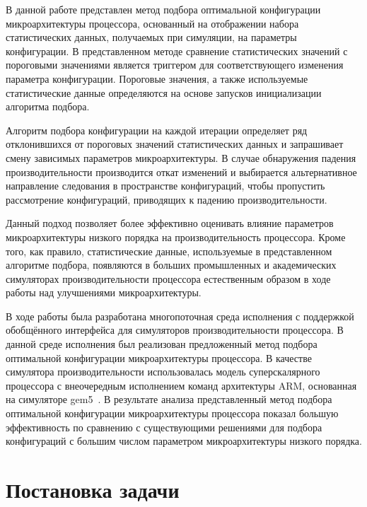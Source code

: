 В данной работе представлен метод подбора оптимальной конфигурации микроархитектуры процессора, основанный на отображении набора статистических данных, получаемых при симуляции, на параметры конфигурации. В представленном методе сравнение статистических значений с пороговыми значениями является триггером для соответствующего изменения параметра конфигурации. Пороговые значения, а также используемые статистические данные определяются на основе запусков инициализации алгоритма подбора.

Алгоритм подбора конфигурации на каждой итерации определяет ряд отклонившихся от пороговых значений статистических данных и запрашивает смену зависимых параметров микроархитектуры. В случае обнаружения падения производительности производится откат изменений и выбирается альтернативное направление следования в пространстве конфигураций, чтобы пропустить рассмотрение конфигураций, приводящих к падению производительности.

Данный подход позволяет более эффективно оценивать влияние параметров микроархитектуры низкого порядка на производительность процессора. Кроме того, как правило, статистические данные, используемые в представленном алгоритме подбора, появляются в больших промышленных и академических симуляторах производительности процессора естественным образом в ходе работы над улучшениями микроархитектуры.

В ходе работы была разработана многопоточная среда исполнения с поддержкой обобщённого интерфейса для симуляторов производительности процессора. В данной среде исполнения был реализован предложенный метод подбора оптимальной конфигурации микроархитектуры процессора. В качестве симулятора производительности использовалась модель суперскалярного процессора с внеочередным исполнением команд архитектуры ARM, основанная на симуляторе gem5~\cite{binkert2011gem5}. В результате анализа представленный метод подбора оптимальной конфигурации микроархитектуры процессора показал большую эффективность по сравнению с существующими решениями для подбора конфигураций с большим числом параметром микроархитектуры низкого порядка.

\section{Постановка задачи}


